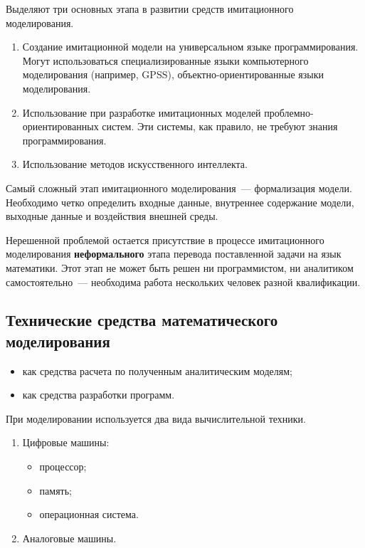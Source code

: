 Выделяют три основных этапа в развитии средств имитационного моделирования.

\begin{enumerate}
    \item Создание имитационной модели на универсальном языке программирования. Могут использоваться специализированные языки компьютерного моделирования (например, GPSS), объектно-ориентированные языки моделирования.
    \item Использование при разработке имитационных моделей проб\-лем\-но-ориен\-тиро\-ван\-ных систем. Эти системы, как правило, не требуют знания программирования.
    \item Использование методов искусственного интеллекта.
\end{enumerate}

Самый сложный этап имитационного моделирования~--- формализация модели. Необходимо четко определить входные данные, внутреннее содержание модели, выходные данные и воздействия внешней среды.

Нерешенной проблемой остается присутствие в процессе имитационного моделирования \textbf{неформального} этапа перевода поставленной задачи на язык математики. Этот этап не может быть решен ни программистом, ни аналитиком самостоятельно~--- необходима работа нескольких человек разной квалификации.

\subsection{Технические средства математического моделирования}

\begin{itemize}
    \item как средства расчета по полученным аналитическим моделям;
    \item как средства разработки программ.
\end{itemize}

При моделировании используется два вида вычислительной техники.

\begin{enumerate}
    \item Цифровые машины:
          \begin{itemize}
              \item процессор;
              \item память;
              \item операционная система.
          \end{itemize}
    \item Аналоговые машины.
\end{enumerate}

